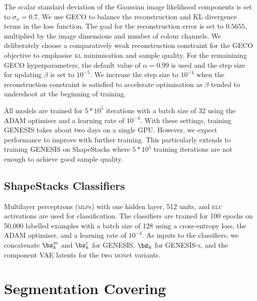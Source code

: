 \documentclass{article}
\begin{document}
The scalar standard deviation of the Gaussian image likelihood components is set to $\sigma_x = 0.7$.
We use \gls{GECO} \citep{rezende2018taming} to balance the reconstruction and KL divergence terms in the loss function.
The goal for the reconstruction error is set to $0.5655$, multiplied by the image dimensions and number of colour channels.
We deliberately choose a comparatively weak reconstruction constraint for the \gls{GECO} objective to emphasise \textsc{kl} minimisation and sample quality.
For the remainining \gls{GECO} hyperparameters, the default value of $\alpha = 0.99$ is used and the step size for updating $\beta$ is set to $10^{-5}$.
We increase the step size to $10^{-4}$ when the reconstruction constraint is satisfied to accelerate optimisation as $\beta$ tended to undershoot at the beginning of training.

All models are trained for $5*10^{5}$ iterations with a batch size of 32 using the \gls{ADAM} optimiser \citep{kingma2014adam} and a learning rate of $10^{-4}$.
With these settings, training \gls{GENESIS} takes about two days on a single GPU.
However, we expect performance to improve with further training.
This particularly extends to training \gls{GENESIS} on ShapeStacks where $5*10^{5}$ training iterations are not enough to achieve good sample quality.


\subsection{ShapeStacks Classifiers}
\label{app:classifiers}

Multilayer perceptrons (\textsc{mlp}s) with one hidden layer, 512 units, and \textsc{elu} activations are used for classification.
The classifiers are trained for 100 epochs on 50,000 labelled examples with a batch size of 128 using a cross-entropy loss, the \gls{ADAM} optimiser, and a learning rate of $10^{-4}$.
As inputs to the classifiers, we concatenate $\bz^m_k$ and $\bz^c_k$ for \gls{GENESIS}, $\bz_k$ for \gls{GENESIS}\textsc{-s}, and the component \gls{VAE} latents for the two \textsc{mon}et variants.





\section{Segmentation Covering}
\label{app:segmentation_covering}
\end{document}
